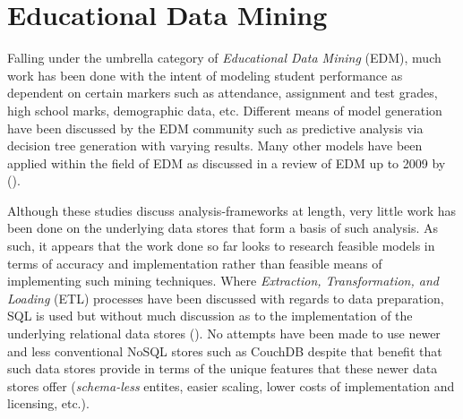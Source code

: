 \section{Educational Data Mining}
Falling under the umbrella category of \textit{Educational Data Mining} (EDM), much work has been done with the intent of modeling student performance as dependent on certain markers such as attendance, assignment and test grades, high school marks, demographic data, etc. Different means of model generation have been discussed by the EDM community such as predictive analysis via decision tree generation \cite{Qasem20016,Balestra2017,casper2017,Dimitris,zebun2005,Mierle:2005} with varying results. Many other models have been applied within the field of EDM as discussed in a review of EDM up to 2009 by (\cite{bakerEdMiningSummary}).

Although these studies discuss analysis-frameworks at length, very little work has been done on the underlying data stores that form a basis of such analysis. As such, it appears that the work done so far looks to research feasible models in terms of accuracy and implementation rather than feasible means of implementing such mining techniques. Where \textit{Extraction, Transformation, and Loading} (ETL) processes have been discussed with regards to data preparation, SQL is used but without much discussion as to the implementation of the underlying relational data stores (\cite{Balestra2017,casper2017,Mierle:2005}). No attempts have been made to use newer and less conventional NoSQL stores such as CouchDB despite that benefit that such data stores provide in terms of the unique features that these newer data stores offer (\textit{schema-less} entites, easier scaling, lower costs of implementation and licensing, etc.).